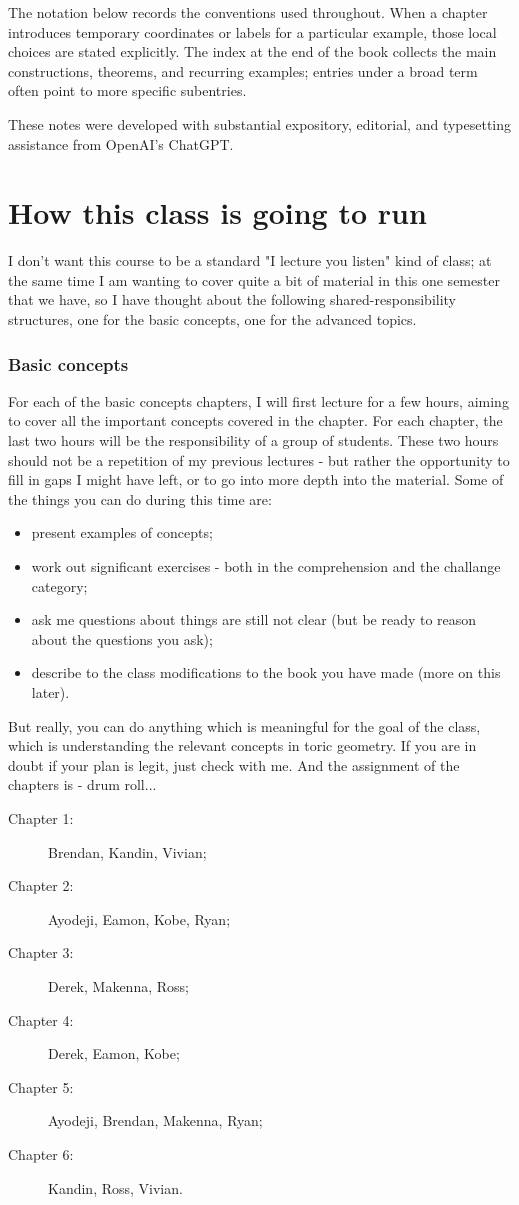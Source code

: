 The notation below records the conventions used throughout. When a
chapter introduces temporary coordinates or labels for a particular
example, those local choices are stated explicitly. The index at the end
of the book collects the main constructions, theorems, and recurring
examples; entries under a broad term often point to more specific
subentries.

\vspace{0.5cm}These notes were developed with substantial expository, editorial, and typesetting assistance from OpenAI’s ChatGPT.

\section*{How this class is going to run}


I don't want this course to be a standard "I lecture you listen" kind of class; at the same time I am wanting to cover quite a bit of material in this one semester that we have, so I have thought about the following shared-responsibility structures, one for the basic concepts, one for the advanced topics.

\subsubsection*{Basic concepts}
For each of the basic concepts chapters, I will first lecture for a few hours, aiming to cover all the important concepts covered in the chapter. For each chapter, the last two hours will be the  responsibility of a  group of students.
These two hours should not be a repetition of my previous lectures - but rather the opportunity to fill in gaps I might have left, or to go into more depth into the material. Some of the things you can do during this time are:
\begin{itemize}
    \item present examples of concepts;
    \item work out significant exercises - both in the comprehension and the challange category;
    \item ask me questions about things are still not clear (but be ready to reason about the questions you ask);
    \item describe to the class modifications to the book you have made (more on this later).
\end{itemize}
But really, you can do anything which is meaningful for the goal of the class, which is understanding the relevant concepts in toric geometry. If you are in doubt if your plan is legit, just check with me.
And the  assignment of the chapters is - drum roll...
\begin{description}
    \item[Chapter 1:] Brendan, Kandin, Vivian;
    \item[Chapter 2:] Ayodeji, Eamon, Kobe, Ryan;
    \item[Chapter 3:] Derek, Makenna,  Ross;
    \item[Chapter 4:] Derek, Eamon, Kobe;
    \item[Chapter 5:] Ayodeji, Brendan, Makenna, Ryan;
    \item[Chapter 6:]  Kandin, Ross, Vivian.
\end{description}
